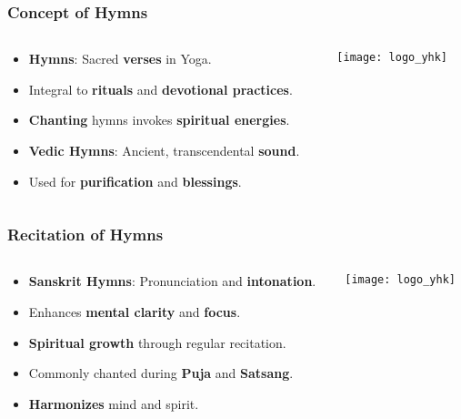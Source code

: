 \begin{frame}[fragile]\frametitle{Concept of Hymns}
\begin{columns}
    \begin{column}[T]{0.5\linewidth}
      \begin{itemize}
        \item \textbf{Hymns}: Sacred \textbf{verses} in Yoga.
        \item Integral to \textbf{rituals} and \textbf{devotional practices}.
        \item \textbf{Chanting} hymns invokes \textbf{spiritual energies}.
        \item \textbf{Vedic Hymns}: Ancient, transcendental \textbf{sound}.
        \item Used for \textbf{purification} and \textbf{blessings}.
      \end{itemize}
    \end{column}
    \begin{column}[T]{0.5\linewidth}
        \begin{center}
        \texttt{[image: logo\_yhk]}
        \end{center}	
    \end{column}
\end{columns}
\end{frame}

\begin{frame}[fragile]\frametitle{Recitation of Hymns}
\begin{columns}
    \begin{column}[T]{0.5\linewidth}
      \begin{itemize}
        \item \textbf{Sanskrit Hymns}: Pronunciation and \textbf{intonation}.
        \item Enhances \textbf{mental clarity} and \textbf{focus}.
        \item \textbf{Spiritual growth} through regular recitation.
        \item Commonly chanted during \textbf{Puja} and \textbf{Satsang}.
        \item \textbf{Harmonizes} mind and spirit.
      \end{itemize}
    \end{column}
    \begin{column}[T]{0.5\linewidth}
        \begin{center}
        \texttt{[image: logo\_yhk]}
        \end{center}	
    \end{column}
\end{columns}
\end{frame}


